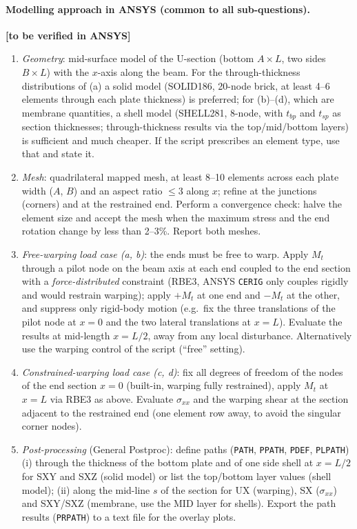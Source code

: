 \paragraph{Modelling approach in ANSYS (common to all sub-questions).} \textbf{[to be verified in ANSYS]}
\begin{enumerate}[label=(\arabic*)]
  \item \emph{Geometry}: mid-surface model of the U-section (bottom $A\times L$, two sides $B\times L$) with the $x$-axis along the beam. For the through-thickness distributions of (a) a solid model (SOLID186, 20-node brick, at least 4--6 elements through each plate thickness) is preferred; for (b)--(d), which are membrane quantities, a shell model (SHELL281, 8-node, with $t_{bp}$ and $t_{sp}$ as section thicknesses; through-thickness results via the top/mid/bottom layers) is sufficient and much cheaper. If the script prescribes an element type, use that and state it.
  \item \emph{Mesh}: quadrilateral mapped mesh, at least 8--10 elements across each plate width ($A$, $B$) and an aspect ratio $\le3$ along $x$; refine at the junctions (corners) and at the restrained end. Perform a convergence check: halve the element size and accept the mesh when the maximum stress and the end rotation change by less than 2--3\%. Report both meshes.
  \item \emph{Free-warping load case (a, b)}: the ends must be free to warp. Apply $M_t$ through a pilot node on the beam axis at each end coupled to the end section with a \emph{force-distributed} constraint (RBE3, ANSYS \texttt{CERIG} only couples rigidly and would restrain warping); apply $+M_t$ at one end and $-M_t$ at the other, and suppress only rigid-body motion (e.g.\ fix the three translations of the pilot node at $x=0$ and the two lateral translations at $x=L$). Evaluate the results at mid-length $x=L/2$, away from any local disturbance. Alternatively use the warping control of the script (``free'' setting).
  \item \emph{Constrained-warping load case (c, d)}: fix all degrees of freedom of the nodes of the end section $x=0$ (built-in, warping fully restrained), apply $M_t$ at $x=L$ via RBE3 as above. Evaluate $\sigma_{xx}$ and the warping shear at the section adjacent to the restrained end (one element row away, to avoid the singular corner nodes).
  \item \emph{Post-processing} (General Postproc): define paths (\texttt{PATH}, \texttt{PPATH}, \texttt{PDEF}, \texttt{PLPATH}) (i) through the thickness of the bottom plate and of one side shell at $x=L/2$ for SXY and SXZ (solid model) or list the top/bottom layer values (shell model); (ii) along the mid-line $s$ of the section for UX (warping), SX ($\sigma_{xx}$) and SXY/SXZ (membrane, use the MID layer for shells). Export the path results (\texttt{PRPATH}) to a text file for the overlay plots.
\end{enumerate}

